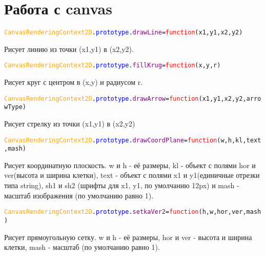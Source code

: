 \documentclass[a4paper,12pt]{article}
\begin{document}
	\section{Работа с canvas}
	\begin{alltt}
		\textcolor{Orange}{CanvasRenderingContext2D}.\textcolor{Blue}{prototype}.\textcolor{Purple}{drawLine}=\textcolor{Red}{function}(x1,y1,x2,y2)
	\end{alltt}
	Рисует линию из точки (x1,y1) в (x2,y2).
	\begin{alltt}
		\textcolor{Orange}{CanvasRenderingContext2D}.\textcolor{Blue}{prototype}.\textcolor{Purple}{fillKrug}=\textcolor{Red}{function}(x,y,r)
	\end{alltt}
	Рисует круг с центром в (x,y) и радиусом r. 
		\begin{alltt}
		\textcolor{Orange}{CanvasRenderingContext2D}.\textcolor{Blue}{prototype}.\textcolor{Purple}{drawArrow}=\textcolor{Red}{function}(x1, y1, x2, y2, arrowType)
	\end{alltt}%
	Рисует стрелку из точки (x1,y1) в (x2,y2)
	\begin{alltt}
		\textcolor{Orange}{CanvasRenderingContext2D}.\textcolor{Blue}{prototype}.\textcolor{Purple}{drawCoordPlane }=\textcolor{Red}{function}(w, h, kl, text, mash)
	\end{alltt}
	Рисует координатную плоскость. w и h  \-- её размеры, kl \-- объект с полями hor и ver(высота и ширина клетки), text \-- объект с полями x1 и y1(единичные отрезки типа string), sh1 и sh2 (шрифты для x1, y1, по умолчанию 12px) и mash - масштаб изображения (по умолчанию равно 1).
	\begin{alltt}
		\textcolor{Orange}{CanvasRenderingContext2D}.\textcolor{Blue}{prototype}.\textcolor{Purple}{setkaVer2  }=\textcolor{Red}{function}(h, w, hor, ver, mash)
	\end{alltt}
	Рисует прямоугольную сетку. w и h  \-- её размеры, hor и ver \-- высота и ширина клетки, mash - масштаб (по умолчанию равно 1).
	\section{}
\end{document}
